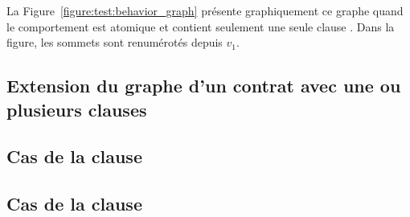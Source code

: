 La Figure~\ref{figure:test:behavior_graph} présente graphiquement ce graphe
quand le comportement est atomique et contient seulement une seule clause
\athrowable.  Dans la figure, les sommets sont renumérotés depuis $v_1$.

\subsection{Extension du graphe d'un contrat avec une ou plusieurs clauses
\abehavior}
\label{subsection:test:behaviors_graph}

\subsection{Cas de la clause \adefault}
\label{subsection:test:default_graph}

\subsection{Cas de la clause \ainvariant}
\label{subsection:test:invariant_graph}
